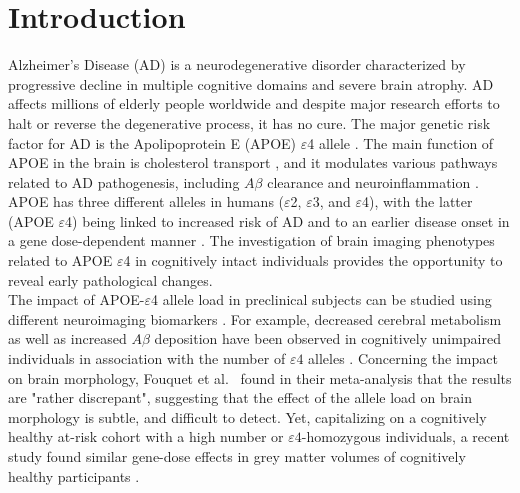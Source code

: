 
\section{Introduction}
\label{sec:introduction}
Alzheimer's Disease (AD) is a neurodegenerative disorder characterized by progressive decline in multiple cognitive domains and severe brain atrophy. AD affects millions of elderly people worldwide \cite{AlzheimersAssociation} and despite major research efforts to halt or reverse the degenerative process, it has no cure. The major genetic risk factor for AD is the Apolipoprotein E (APOE) $\varepsilon$4 allele \cite{Saunders1993}. The main function of APOE in the brain is cholesterol transport \cite{Saunders1993}, and it modulates various pathways related to AD pathogenesis, including $A\beta$ clearance and neuroinflammation \cite{Zhao2018}. APOE has three different alleles in humans ($\varepsilon$2, $\varepsilon$3, and $\varepsilon$4), with the latter (APOE $\varepsilon$4) being linked to increased risk of AD and to an earlier disease onset in a gene dose-dependent manner \cite{Liu2013a}. The investigation of brain imaging phenotypes related to APOE $\varepsilon$4 in cognitively intact individuals provides the opportunity to reveal early pathological changes. \\

The impact of APOE-$\varepsilon$4 allele load in preclinical subjects can be studied using different neuroimaging biomarkers \cite{Chetelat2013}. For example, decreased cerebral metabolism as well as increased $A\beta$ deposition have been observed in cognitively unimpaired individuals in association with the number of $\varepsilon4$ alleles \cite{Reiman2005,Reiman2009}. Concerning the impact on brain morphology, Fouquet et al.\ \cite{Fouquet2014} found in their meta-analysis that the results are "rather discrepant", suggesting that the effect of the allele load on brain morphology is subtle, and difficult to detect. Yet, capitalizing on a cognitively healthy at-risk cohort with a high number or $\varepsilon4$-homozygous individuals, a recent study found similar gene-dose effects in grey matter volumes of cognitively healthy participants \cite{Cacciaglia2018}. \\


